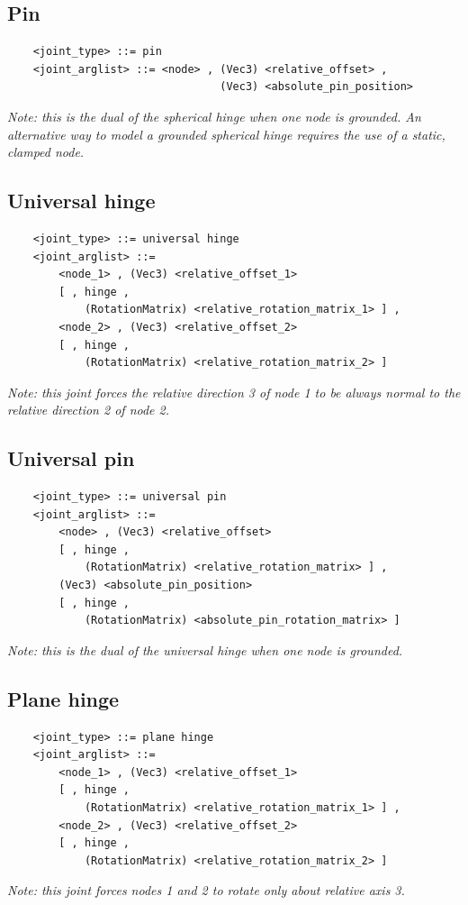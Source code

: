 \documentclass[10pt,dvips]{report}
\begin{document}
\subsection{Pin}
\begin{verbatim}
    <joint_type> ::= pin
    <joint_arglist> ::= <node> , (Vec3) <relative_offset> ,
                                 (Vec3) <absolute_pin_position>
\end{verbatim}
{\em
    Note: this is the dual of the spherical hinge when one node is grounded.
    An alternative way to model a grounded spherical hinge requires the use
    of a static, clamped node.
}

\subsection{Universal hinge}
\begin{verbatim}
    <joint_type> ::= universal hinge
    <joint_arglist> ::= 
        <node_1> , (Vec3) <relative_offset_1> 
        [ , hinge , 
            (RotationMatrix) <relative_rotation_matrix_1> ] ,
        <node_2> , (Vec3) <relative_offset_2>
        [ , hinge , 
            (RotationMatrix) <relative_rotation_matrix_2> ]
\end{verbatim}
{\em
    Note: this joint forces the relative direction 3 of node 1 to be always 
    normal to the relative direction 2 of node 2.
}

\subsection{Universal pin}
\begin{verbatim}
    <joint_type> ::= universal pin
    <joint_arglist> ::= 
        <node> , (Vec3) <relative_offset>
        [ , hinge , 
            (RotationMatrix) <relative_rotation_matrix> ] ,
        (Vec3) <absolute_pin_position>
        [ , hinge , 
            (RotationMatrix) <absolute_pin_rotation_matrix> ]
\end{verbatim}
{\em
    Note: this is the dual of the universal hinge when one node is grounded.
}

\subsection{Plane hinge}
\begin{verbatim}
    <joint_type> ::= plane hinge
    <joint_arglist> ::= 
        <node_1> , (Vec3) <relative_offset_1> 
        [ , hinge , 
            (RotationMatrix) <relative_rotation_matrix_1> ] ,
        <node_2> , (Vec3) <relative_offset_2>
        [ , hinge , 
            (RotationMatrix) <relative_rotation_matrix_2> ]
\end{verbatim}
{\em
    Note: this joint forces nodes 1 and 2 to rotate only about relative 
    axis 3.
}
\end{document}
